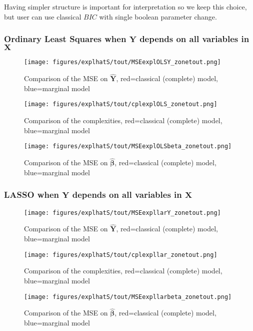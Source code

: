 \documentclass[12pt,a4paper]{report}
\begin{document}
 Having simpler structure is important for interpretation so we keep this choice, but user can use classical $BIC$ with single boolean parameter change.

 
\FloatBarrier

\newpage
\subsubsection{Ordinary Least Squares when $\boldsymbol{Y}$ depends on all variables in $\boldsymbol{X}$}

	\begin{figure}[h!]
	\centering
		  \texttt{[image: figures/explhatS/tout/MSEexplOLSY\_zonetout.png]}
		\caption{Comparison of the MSE on $\hat{\boldsymbol{Y}}$, red=classical (complete) model, blue=marginal model}\label{MSEexplOLSY_zonetout}
	\end{figure}
	\begin{figure}[h!]
	\centering
		  \texttt{[image: figures/explhatS/tout/cplexplOLS\_zonetout.png]}
		\caption{Comparison of the complexities, red=classical (complete) model, blue=marginal model}\label{cplexplOLS_zonetout}
	\end{figure}
	\begin{figure}[h!]
	\centering
		  \texttt{[image: figures/explhatS/tout/MSEexplOLSbeta\_zonetout.png]}
		\caption{Comparison of the MSE on $\hat{\boldsymbol{\beta}}$, red=classical (complete) model, blue=marginal model}\label{MSEexplOLSbeta_zonetout}
	\end{figure}
	\FloatBarrier
\newpage
\subsubsection{LASSO when $\boldsymbol{Y}$ depends on all variables in $\boldsymbol{X}$}

	\begin{figure}[h!]
	\centering
		  \texttt{[image: figures/explhatS/tout/MSEexpllarY\_zonetout.png]}
		\caption{Comparison of the MSE on $\hat{\boldsymbol{Y}}$, red=classical (complete) model, blue=marginal model}\label{MSEexpllarY_zonetout}
	\end{figure}
	\begin{figure}[h!]
	\centering
		  \texttt{[image: figures/explhatS/tout/cplexpllar\_zonetout.png]}
		\caption{Comparison of the complexities, red=classical (complete) model, blue=marginal model}\label{cplexpllar_zonetout}
	\end{figure}
	\begin{figure}[h!]
	\centering
		  \texttt{[image: figures/explhatS/tout/MSEexpllarbeta\_zonetout.png]}
		\caption{Comparison of the MSE on $\hat{\boldsymbol{\beta}}$, red=classical (complete) model, blue=marginal model}\label{MSEexpllarbeta_zonetout}
	\end{figure}
	\FloatBarrier
\newpage
\end{document}
